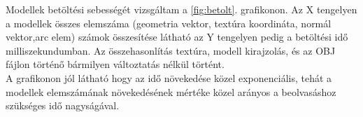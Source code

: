 Modellek betöltési sebességét vizsgáltam a  \ref{fig:betolt}. grafikonon. Az X tengelyen a modellek összes elemszáma (geometria vektor, textúra koordináta, normál vektor,arc elem) számok összesítése látható az Y tengelyen pedig a betöltési idő milliszekundumban. Az összehasonlítás textúra, modell kirajzolás, és az OBJ fájlon történő bármilyen változtatás nélkül történt.\\

A grafikonon jól látható hogy az idő növekedése közel exponenciális, tehát a modellek elemszámának növekedésének mértéke közel  arányos a beolvasáshoz szükséges idő nagyságával.



